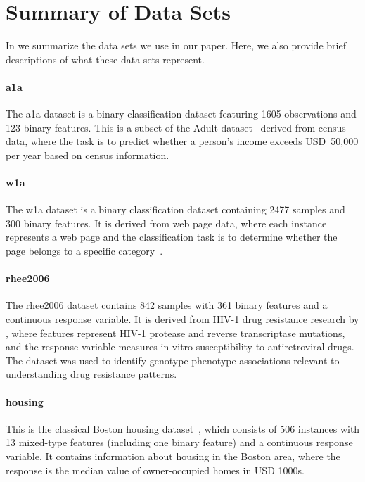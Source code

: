 \section{Summary of Data Sets}\label{sec:data-summary}

In  we summarize the data sets we use in our paper. Here, we also
provide brief descriptions of what these data sets represent.

\paragraph{a1a}

The a1a dataset is a binary classification dataset featuring 1605 observations and 123
binary features. This is a subset of the Adult dataset~\citep{becker1996,platt1998}
derived from census data, where the task is to predict whether a person's income exceeds
USD~50,000 per year based on census information.

\paragraph{w1a}

The w1a dataset is a binary classification dataset containing 2477 samples and 300 binary
features. It is derived from web page data, where each instance represents a web page and
the classification task is to determine whether the page belongs to a specific
category~\citep{platt1998}.

\paragraph{rhee2006}

The rhee2006 dataset contains 842 samples with 361 binary features and a continuous
response variable. It is derived from HIV-1 drug resistance research by \citet{rhee2006}
, where features represent HIV-1 protease and reverse transcriptase mutations, and the
response variable measures in vitro susceptibility to antiretroviral drugs. The dataset was
used to identify genotype-phenotype associations relevant to understanding drug resistance
patterns.

\paragraph{housing}

This is the classical Boston housing dataset~\citep{harrison1978}, which consists of
506 instances with 13 mixed-type features (including one binary feature) and a continuous
response variable. It contains information about housing in the Boston area, where the
response is the median value of owner-occupied homes in USD 1000s.

